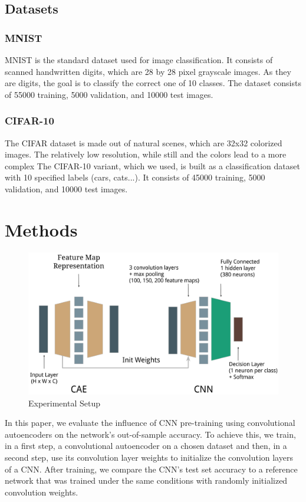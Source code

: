 \documentclass[draft]{article}
\begin{document}
\subsection{Datasets}
  \subsubsection{MNIST}
    MNIST \citep{lecun1998mnist} is the standard dataset used for image classification. It consists of scanned handwritten digits, which are 28 by 28 pixel grayscale images. As they are digits, the goal is to classify the correct one of 10 classes.
    The dataset consists of 55000 training, 5000 validation, and 10000 test images.
  \subsubsection{CIFAR-10}
    The CIFAR dataset \citep{krizhevsky2009learning} is made out of natural scenes, which are 32x32 colorized images. The relatively low resolution, while still and the colors lead to a more complex
    The CIFAR-10 variant, which we used, is built as a classification dataset with 10 specified labels (cars, cats...).
    It consists of 45000 training, 5000 validation, and 10000 test images.

\section{Methods}

  \begin{figure}[ht]
    \centering
    \includegraphics[width=0.6\linewidth]{../graphics/setup.png}
    \caption{Experimental Setup}
    \label{fig:experimental_setup}
  \end{figure}

  In this paper, we evaluate the influence of CNN pre-training using convolutional autoencoders on the network's out-of-sample accuracy. To achieve this, we train, in a first step, a convolutional autoencoder on a chosen dataset and then, in a second step, use its convolution layer weights to initialize the convolution layers of a CNN. After training, we compare the CNN's test set accuracy to a reference network that was trained under the same conditions with randomly initialized convolution weights. 
\end{document}
